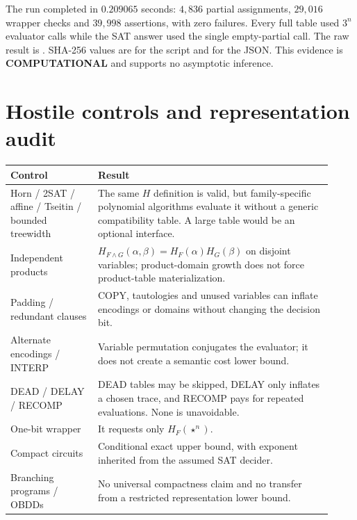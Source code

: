 \documentclass[11pt]{article}
\newcommand{\COMP}{\textbf{COMPUTATIONAL}}
\begin{document}
The run completed in $0.209065$ seconds: $4{,}836$ partial assignments,
$29{,}016$ wrapper checks and $39{,}998$ assertions, with zero failures.
Every full table used $3^n$ evaluator calls while the SAT answer used the
single empty-partial call.  The raw result is
.
SHA-256 values are
for the script and
for the JSON.  This evidence is \COMP{} and supports no asymptotic inference.

\section{Hostile controls and representation audit}

\begin{center}\small
\begin{tabular}{@{}p{0.25\linewidth}p{0.67\linewidth}@{}}
\toprule
Control & Result\\ \midrule
Horn / 2SAT / affine / Tseitin / bounded treewidth & The same $H$ definition
is valid, but family-specific polynomial algorithms evaluate it without a
generic compatibility table.  A large table would be an optional interface.\\
Independent products & $H_{F\wedge G}(\alpha,\beta)=H_F(\alpha)H_G(\beta)$
on disjoint variables; product-domain growth does not force product-table
materialization.\\
Padding / redundant clauses & COPY, tautologies and unused variables can
inflate encodings or domains without changing the decision bit.\\
Alternate encodings / INTERP & Variable permutation conjugates the evaluator;
it does not create a semantic cost lower bound.\\
DEAD / DELAY / RECOMP & DEAD tables may be skipped, DELAY only inflates a
chosen trace, and RECOMP pays for repeated evaluations.  None is unavoidable.\\
One-bit wrapper & It requests only $H_F(\star^n)$.\\
Compact circuits & Conditional exact upper bound, with exponent inherited
from the assumed SAT decider.\\
Branching programs / OBDDs & No universal compactness claim and no transfer
from a restricted representation lower bound.\\
\bottomrule
\end{tabular}
\end{center}
\end{document}
